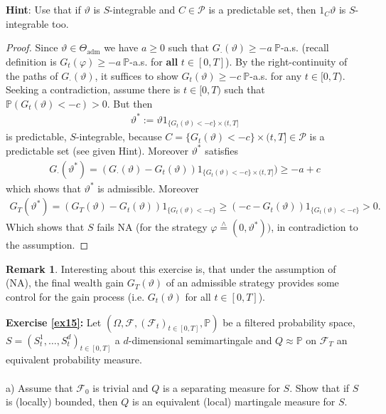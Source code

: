 \documentclass[12pt,a4paper, twoside]{article}
\theoremstyle{definition}
\newtheorem{rem}{Remark}[section]
\newcommand{\PP}{\mathbb{P}} %
\newcommand{\teq}{\overset{\wedge}{=}}
\begin{document}
\\\\
\textbf{Hint}: Use that if $\vartheta$ is $S$-integrable and $C \in \mathcal{P}$ is  a predictable set, then $1_C \vartheta$ is $S$-integrable too. 
\begin{proof}
Since $\vartheta \in \Theta_\text{adm}$ we have $a \geq 0$ such that $G_\cdot( \vartheta) \geq -a \ \PP$-a.s. (recall definition is $G_t( \varphi) \geq -a \ \PP$-a.s. for \textbf{all} $t \in [0,T]$). By the right-continuity of the paths of $G_\cdot( \vartheta)$, it suffices to show $G_t( \vartheta) \geq -c \ \PP$-a.s. for any $t \in [0,T)$. Seeking a contradiction, assume there is $t \in [0,T)$ such that $\PP(G_t( \vartheta) < -c) >0$. But then 
\begin{align*}
\vartheta^*:= \vartheta 1_{\{ G_t( \vartheta)<-c\} \times (t,T]}
\end{align*}
is predictable, $S$-integrable, because $C= \{ G_t( \vartheta)<-c\} \times (t,T] \in \mathcal{P}$ is a predictable set (see given Hint). Moreover $\vartheta^*$ satisfies 
\begin{align*}
G_\cdot ( \vartheta^*)= ( G_\cdot ( \vartheta)- G_t( \vartheta))1_{ \{ G_t( \vartheta)<-c\} \times (t,T]}) \geq -a +c
\end{align*}
which shows that $\vartheta^*$ is admissible. Moreover 
\begin{align*}
G_T( \vartheta^*)=(G_T( \vartheta)- G_t( \vartheta))1_{\{ G_t( \vartheta)<-c\}} \geq (-c- G_t( \vartheta))1_{\{ G_t( \vartheta)<-c\}} >0.
\end{align*}
Which shows that $S$ fails NA (for the strategy $\varphi \teq (0, \vartheta^*))$, in contradiction to the assumption. 
\end{proof}
\begin{rem} Interesting about this exercise is, that under the assumption of (NA), the final wealth gain $G_T( \vartheta)$ of an admissible strategy provides some control for the gain process (i.e. $G_t( \vartheta)$ for all $t \in [0,T]$). 
\end{rem}
\newpage
\noindent \textbf{Exercise \ref{ex15}:} Let $( \Omega, \mathcal{F}, ( \mathcal{F}_t)_{t \in [0,T]}, \PP)$ be a filtered probability space, $S=(S_t^1, \dots , S_t^d)_{t \in [0,T]}$ a $d$-dimensional semimartingale and $Q \approx \PP$ on $\mathcal{F}_T$ an equivalent probability measure. \\
\\
a) Assume that $\mathcal{F}_0$ is trivial and $Q$ is a separating measure for $S$. Show that if $S$ is (locally) bounded, then $Q$ is an equivalent (local) martingale measure for $S$. \\
\end{document}
